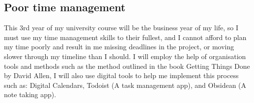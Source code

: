 \documentclass[titlepage]{article}
\begin{document}
\subsection{Poor time management}
This 3rd year of my university course will be the business year of my life, so I must use my time management skills to their fullest, and I cannot afford to plan my time poorly and result in me missing deadlines in the project, or moving slower through my timeline than I should. I will employ the help of organisation tools and methods such as the method outlined in the book Getting Things Done by David Allen, I will also use digital tools to help me implement this process such as: Digital Calendars, Todoist (A task management app), and Obsidean (A note taking app).
\end{document}
